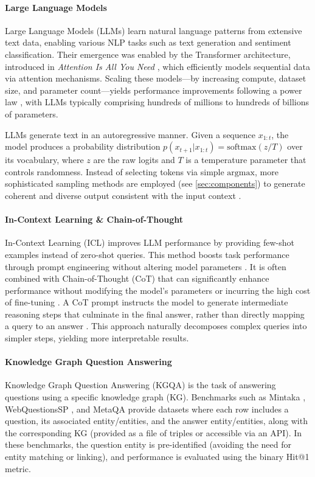 \documentclass[pdflatex,sn-mathphys-num]{sn-jnl}%
\theoremstyle{thmstyleone}%
\theoremstyle{thmstyletwo}%
\theoremstyle{thmstylethree}%
\begin{document}
\paragraph{Large Language Models} Large Language Models (LLMs) learn natural language patterns from extensive text data, enabling various NLP tasks such as text generation and sentiment classification. Their emergence was enabled by the Transformer architecture, introduced in \textit{Attention Is All You Need} \cite{Vaswani2017}, which efficiently models sequential data via attention mechanisms. Scaling these models—by increasing compute, dataset size, and parameter count—yields performance improvements following a power law \cite{kaplan2020}, with LLMs typically comprising hundreds of millions to hundreds of billions of parameters.

LLMs generate text in an autoregressive manner. Given a sequence $x_{1:t}$, the model produces a probability distribution $p(x_{t+1}|x_{1:t}) = \mathrm{softmax}(z/T)$ over its vocabulary, where $z$ are the raw logits and $T$ is a temperature parameter that controls randomness. Instead of selecting tokens via simple $\mathrm{argmax}$, more sophisticated sampling methods are employed (see \autoref{sec:components}) to generate coherent and diverse output consistent with the input context \cite{Zhao2023}.

\paragraph{In-Context Learning \& Chain-of-Thought}

In-Context Learning (ICL) improves LLM performance by providing few-shot examples instead of zero-shot queries. This method boosts task performance through prompt engineering without altering model parameters \cite{chen2023}. It is often combined with Chain-of-Thought (CoT) that can significantly enhance performance without modifying the model's parameters or incurring the high cost of fine-tuning \cite{Wei2023}. A CoT prompt instructs the model to generate intermediate reasoning steps that culminate in the final answer, rather than directly mapping a query to an answer \cite{Wei2023}. This approach naturally decomposes complex queries into simpler steps, yielding more interpretable results.


\paragraph{Knowledge Graph Question Answering} Knowledge Graph Question Answering (KGQA) is the task of answering questions using a specific knowledge graph (KG). Benchmarks such as Mintaka \cite{Sen2022}, WebQuestionsSP \cite{Yih2016}, and MetaQA \cite{Zhang} provide datasets where each row includes a question, its associated entity/entities, and the answer entity/entities, along with the corresponding KG (provided as a file of triples or accessible via an API). In these benchmarks, the question entity is pre-identified (avoiding the need for entity matching or linking), and performance is evaluated using the binary Hit@1 metric.
\end{document}
